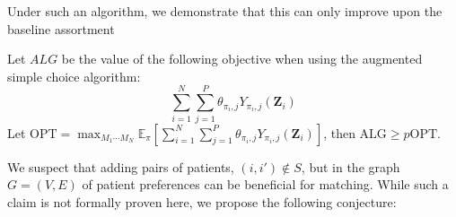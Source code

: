 Under such an algorithm, we demonstrate that this can only improve upon the baseline assortment
\begin{theorem}
    Let $ALG$ be the value of the following objective when using the augmented simple choice algorithm: 
    \begin{equation}
     \sum_{i=1}^{N} \sum_{j=1}^{P} \theta_{\pi_{i},j} Y_{\pi_{i},j}(\mathbf{Z}_{i})
    \end{equation}
    Let $\mathrm{OPT} = \max_{M_{1} \cdots M_{N}} \mathbb{E}_{\pi}[\sum_{i=1}^{N} \sum_{j=1}^{P} \theta_{\pi_{i},j} Y_{\pi_{i},j}(\mathbf{Z}_{i})]$, then $\mathrm{ALG} \geq p \mathrm{OPT}$.
\end{theorem}
We suspect that adding pairs of patients, $(i,i') \notin S$, but in the graph $G = (V,E)$ of patient preferences can be beneficial for matching. 
While such a claim is not formally proven here, we propose the following conjecture: 

